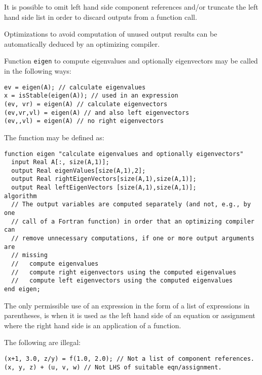It is possible to omit left hand side component references and/or
truncate the left hand side list in order to discard outputs from a
function call.

\begin{nonnormative}
Optimizations to avoid computation of unused output results can
be automatically deduced by an optimizing compiler.
\end{nonnormative}

\begin{example}
Function \lstinline!eigen! to compute eigenvalues and optionally
eigenvectors may be called in the following ways:
\begin{lstlisting}[language=modelica]
ev = eigen(A); // calculate eigenvalues
x = isStable(eigen(A)); // used in an expression
(ev, vr) = eigen(A) // calculate eigenvectors
(ev,vr,vl) = eigen(A) // and also left eigenvectors
(ev,,vl) = eigen(A) // no right eigenvectors
\end{lstlisting}
The function may be defined as:
\begin{lstlisting}[language=modelica]
function eigen "calculate eigenvalues and optionally eigenvectors"
  input Real A[:, size(A,1)];
  output Real eigenValues[size(A,1),2];
  output Real rightEigenVectors[size(A,1),size(A,1)];
  output Real leftEigenVectors [size(A,1),size(A,1)];
algorithm
  // The output variables are computed separately (and not, e.g., by one
  // call of a Fortran function) in order that an optimizing compiler can
  // remove unnecessary computations, if one or more output arguments are
  // missing
  //   compute eigenvalues
  //   compute right eigenvectors using the computed eigenvalues
  //   compute left eigenvectors using the computed eigenvalues
end eigen;
\end{lstlisting}
\end{example}

The only permissible use of an expression in the form of a list of
expressions in parentheses, is when it is used as the left hand side of
an equation or assignment where the right hand side is an application of
a function.

\begin{example}
The following are illegal:
\begin{lstlisting}[language=modelica]
(x+1, 3.0, z/y) = f(1.0, 2.0); // Not a list of component references.
(x, y, z) + (u, v, w) // Not LHS of suitable eqn/assignment.
\end{lstlisting}
\end{example}

